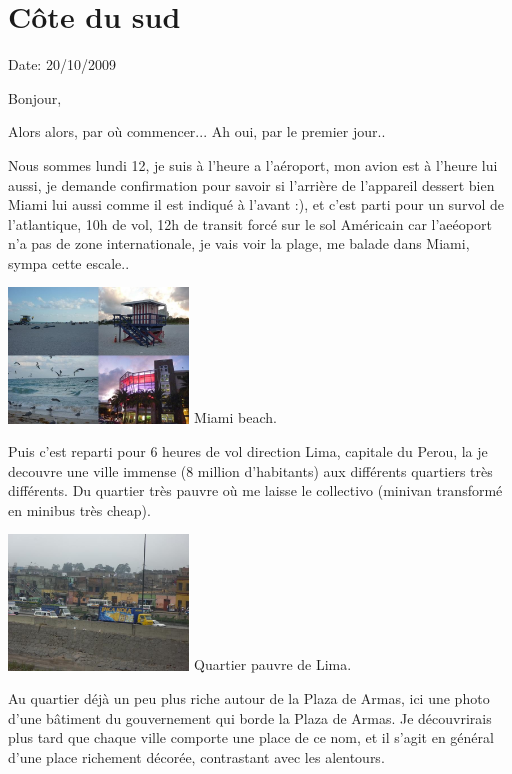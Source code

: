 \section{Côte du sud}

Date: 20/10/2009

\begin{multicols}{2}

Bonjour,

Alors alors, par où commencer... Ah oui, par le premier jour..

Nous sommes lundi 12, je suis à l'heure a l'aéroport, mon avion est à l'heure lui aussi, je demande confirmation pour savoir si l'arrière de l'appareil dessert bien Miami lui aussi comme il est indiqué à l'avant :), et c'est parti pour un survol de l'atlantique, 10h de vol, 12h de transit forcé sur le sol Américain car l'aeéoport n'a pas de zone internationale, je vais voir la plage, me balade dans Miami, sympa cette escale..

\hspace*{-0.65cm}
\includegraphics[width=4.8cm]{articles/Cote-du-sud/1255996649K0tQ.jpg}
Miami beach.

Puis c'est reparti pour 6 heures de vol direction Lima, capitale du Perou, la je decouvre une ville immense (8 million d'habitants) aux différents quartiers très différents. Du quartier très pauvre où me laisse le collectivo (minivan transformé en minibus très cheap).

\hspace*{-0.65cm}
\includegraphics[width=4.8cm]{articles/Cote-du-sud/1255996655Vfsf.jpg}
Quartier pauvre de Lima.

Au quartier déjà un peu plus riche autour de la Plaza de Armas, ici une photo d'une bâtiment du gouvernement qui borde la Plaza de Armas. Je découvrirais plus tard que chaque ville comporte une place de ce nom, et il s'agit en général d'une place richement décorée, contrastant avec les alentours.


\end{multicols}
